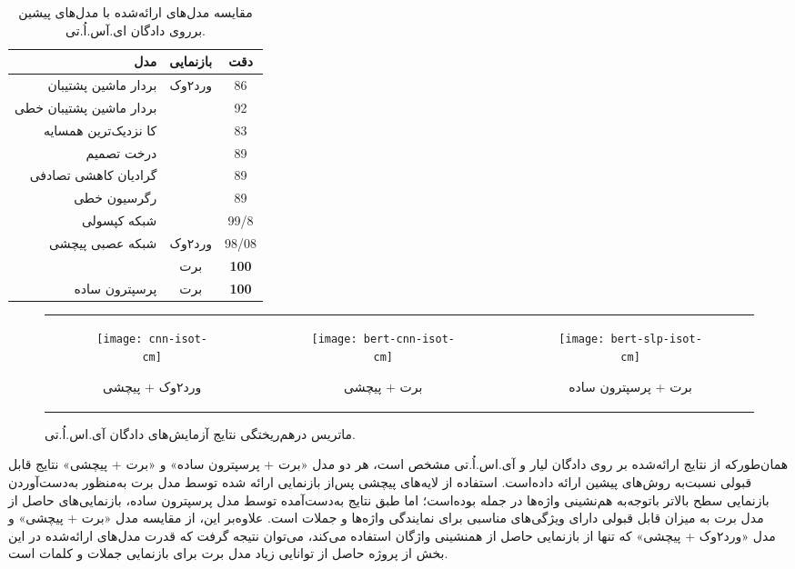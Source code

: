 \begin{table}[!h]
	\caption{ مقایسه مدل‌های ارائه‌شده با مدل‌های پیشین برروی دادگان ای.آس.اُ.تی. }
	\label{table.ISOTResults}
	\begin{center}
		\begin{tabular}{|r|c|c|}
			\hline
			مدل & بازنمایی & دقت \\
			\hline
			\hline
			بردار ماشین پشتیبان &\multirow{7}{*}{ ورد۲وک} & 86 \\
			بردار ماشین پشتیبان خطی &  & 92 \\
			کا نزدیک‌ترین همسایه&  & 83 \\
			درخت تصمیم &  & 89 \\
			گرادیان کاهشی تصادفی &  & 89 \\
			رگرسیون خطی &  & 89 \\
			شبکه کپسولی &  & 99/8 \\
			\hline 
			\hline 
			\multirow{2}{*}{شبکه عصبی پیچشی} & ورد۲وک & 98/08 \\
			\cline{2-3}
			& برت & \textbf{100} \\
			\hline
			پرسپترون ساده & برت & \textbf{100} \\
			\hline
		\end{tabular}
	\end{center}
\end{table}

\begin{figure}[!h]
	\centering
	\begin{tabular}{ccc}
		\begin{subfigure}{0.33\textwidth}
			\centering
			\caption{ورد۲وک + پیچشی}
			\texttt{[image: cnn-isot-cm]}
		\end{subfigure}
		& 
		\begin{subfigure}{0.33\textwidth}
			\centering
			\caption{برت + پیچشی}
			\texttt{[image: bert-cnn-isot-cm]}
		\end{subfigure}
		&
		\begin{subfigure}{0.33\textwidth}
			\centering
			\caption{برت + پرسپترون ساده}
			\texttt{[image: bert-slp-isot-cm]}
		\end{subfigure}
	\end{tabular}
	\caption{ماتریس درهم‌ریختگی نتایج آزمایش‌های دادگان آی.اس.اُ.تی.}
	\label{ISOT-CM}
\end{figure}



همان‌طورکه از نتایج ارائه‌شده بر روی دادگان لیار و آی.اس.اُ.تی مشخص است، هر دو مدل «برت +‌ پرسپترون ساده» و «برت + پیچشی» نتایج قابل قبولی نسبت‌به روش‌های پیشین ارائه داده‌است. استفاده از لایه‌های پیچشی پس‌از بازنمایی ارائه شده توسط مدل برت به‌منظور به‌دست‌آوردن بازنمایی سطح بالاتر باتوجه‌به هم‌نشینی واژه‌ها در جمله بوده‌است؛ اما طبق نتایج به‌دست‌آمده توسط مدل پرسپترون ساده، بازنمایی‌های حاصل از مدل برت به میزان قابل قبولی دارای ویژگی‌های مناسبی برای نمایندگی واژه‌ها و جملات است. علاوه‌بر این، از مقایسه مدل «برت +‌ پیچشی» و مدل «ورد۲وک + پیچشی» که تنها از بازنمایی حاصل از همنشینی واژگان استفاده می‌کند، می‌توان نتیجه گرفت که قدرت مدل‌های ارائه‌شده در این بخش از پروژه حاصل از توانایی زیاد مدل برت برای بازنمایی جملات و کلمات است.
